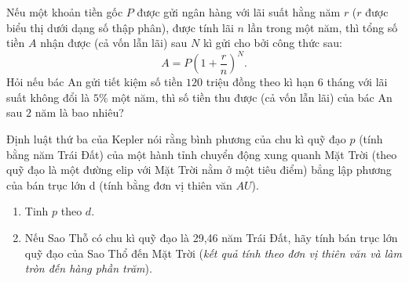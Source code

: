\begin{bt}%
	Nếu một khoản tiền gốc $P$ được gửi ngân hàng với lãi suất hằng năm $r$ ($r$ được biểu thị dưới dạng số thập phân), được tính lãi $n$ lần trong một năm, thì tổng số tiền $A$ nhận được (cả vốn lẫn lãi) sau $N$ kì gửi cho bởi công thức sau:
	$$
	A=P\left(1+\dfrac{r}{n}\right)^N .
	$$
	Hỏi nếu bác An gửi tiết kiệm số tiền $120$ triệu đồng theo kì hạn $6$ tháng với lãi suất không đổi là $5 \%$ một năm, thì số tiền thu được (cả vốn lẫn lãi) của bác An sau $2$ năm là bao nhiêu?
\end{bt} 
\begin{bt}
	Định luật thứ ba của Kepler nói rằng bình phương của chu kì quỹ đạo $p$ (tính bằng năm Trái Đất) của một hành tỉnh chuyển động xung quanh Mặt Trời (theo quỹ đạo là một đường elip với Mặt Trời nằm ở một tiêu điểm) bẳng lập phương của bán trục lớn d (tính bằng đơn vị thiên văn $AU$).
	\begin{enumerate}
		\item  Tinh $p$ theo $d$.
		\item  Nếu Sao Thỗ có chu kì quỹ đạo là 29,46 năm Trái Đất, hãy tính bán trục lớn quỹ đạo của Sao Thổ đến Mặt Trời (\textit{kết quả tính theo đơn vị thiên văn và làm tròn đến hàng phần trăm}).
	\end{enumerate}
\end{bt} 

